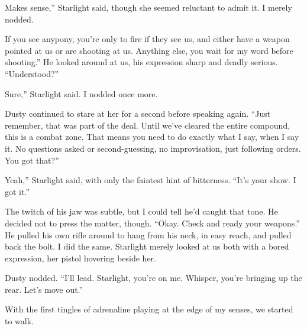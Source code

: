 \leavevmode{}Makes sense,” Starlight said, though she seemed reluctant to admit it. I merely nodded.

\leavevmode{}If you see anypony, you’re only to fire if they see us, and either have a weapon pointed at us or are shooting at us. Anything else, you wait for my word before shooting.” He looked around at us, his expression sharp and deadly serious. “Understood?”

\leavevmode{}Sure,” Starlight said. I nodded once more.

Dusty continued to stare at her for a second before speaking again. “Just remember, that was part of the deal. Until we’ve cleared the entire compound, this is a combat zone. That means you need to do exactly what I say, when I say it. No questions asked or second-guessing, no improvisation, just following orders. You got that?”

\leavevmode{}Yeah,” Starlight said, with only the faintest hint of bitterness. “It’s your show. I got it.”

The twitch of his jaw was subtle, but I could tell he’d caught that tone. He decided not to press the matter, though. “Okay. Check and ready your weapons.” He pulled his own rifle around to hang from his neck, in easy reach, and pulled back the bolt. I did the same. Starlight merely looked at us both with a bored expression, her pistol hovering beside her.

Dusty nodded. “I’ll lead. Starlight, you’re on me. Whisper, you’re bringing up the rear. Let’s move out.”

With the first tingles of adrenaline playing at the edge of my senses, we started to walk.